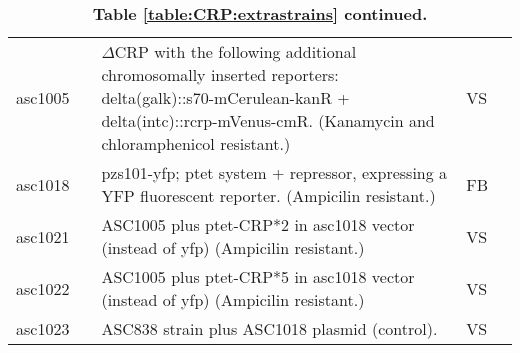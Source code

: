 \begin{table}[h]
\begin{tabularx}{\textwidth}{llXll}
%
asc1005	& &	$\Delta$CRP with the following additional chromosomally inserted reporters: delta(galk)::s70-mCerulean-kanR + delta(intc)::rcrp-mVenus-cmR. (Kanamycin and chloramphenicol resistant.) & VS \\
asc1018	& &	pzs101-yfp; ptet system + repressor, expressing a YFP fluorescent reporter. (Ampicilin resistant.) & FB \\
asc1021	& &	ASC1005 plus ptet-CRP*2 in asc1018 vector (instead of yfp) (Ampicilin resistant.) & VS \\
asc1022	& &	ASC1005 plus ptet-CRP*5 in asc1018 vector (instead of yfp) (Ampicilin resistant.) & VS \\
asc1023	& & ASC838 strain plus ASC1018 plasmid (control). & VS \\
		\hline
	\end{tabularx}
	\caption*{\textbf{Table \ref{table:CRP:extrastrains} continued.}}
\end{table}